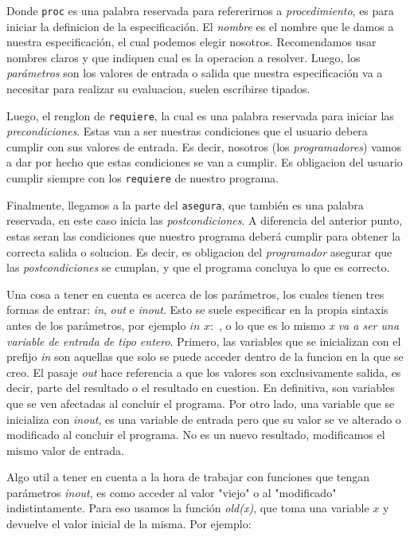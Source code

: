 \documentclass{article}
\begin{document}
Donde \texttt{proc} es una palabra reservada para refererirnos a \textit{procedimiento}, es para iniciar la definicion de la especificación. El \textit{nombre} es el nombre que le damos a nuestra especificación, el cual podemos elegir nosotros. Recomendamos usar nombres claros y que indiquen cual es la operacion a resolver. Luego, los \textit{parámetros} son los valores de entrada o salida que nuestra especificación va a necesitar para realizar su evaluacion, suelen escribirse tipados.

Luego, el renglon de \texttt{requiere}, la cual es una palabra reservada para iniciar las \textit{precondiciones}. Estas van a ser nuestras condiciones que el usuario debera cumplir con sus valores de entrada. Es decir, nosotros (los \textit{programadores}) vamos a dar por hecho que estas condiciones se van a cumplir. Es obligacion del usuario cumplir siempre con los \texttt{requiere} de nuestro programa.

Finalmente, llegamos a la parte del \texttt{asegura}, que también es una palabra reservada, en este caso inicia las \textit{postcondiciones}. A diferencia del anterior punto, estas seran las condiciones que nuestro programa deberá cumplir para obtener la correcta salida o solucion. Es decir, es obligacion del \textit{programador} asegurar que las \textit{postcondiciones} se cumplan, y que el programa concluya lo que es correcto.

Una cosa a tener en cuenta es acerca de los parámetros, los cuales tienen tres formas de entrar: \textit{in}, \textit{out} e \textit{inout}. Esto se suele especificar en la propia sintaxis antes de los parámetros, por ejemplo $in$ $x :$ \ent, o lo que es lo mismo \textit{x va a ser una variable de entrada de tipo entero}. Primero, las variables que se inicializan con el prefijo \textit{in} son aquellas que solo se puede acceder dentro de la funcion en la que se creo. El pasaje \textit{out} hace referencia a que los valores son exclusivamente salida, es decir, parte del resultado o el resultado en cuestion. En definitiva, son variables que se ven afectadas al concluir el programa. Por otro lado, una variable que se inicializa con \textit{inout}, es una variable de entrada pero que su valor se ve alterado o modificado al concluir el programa. No es un nuevo resultado, modificamos el mismo valor de entrada.

Algo util a tener en cuenta a la hora de trabajar con funciones que tengan parámetros \textit{inout}, es como acceder al valor "viejo" o al "modificado" indistintamente. Para eso usamos la función \textit{old(x)}, que toma una variable $x$ y devuelve el valor inicial de la misma. Por ejemplo:
\end{document}
